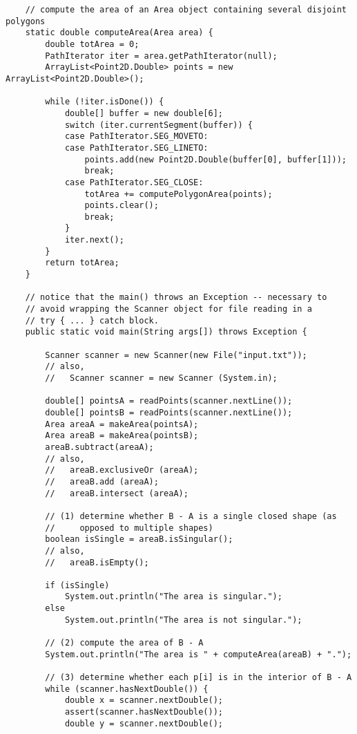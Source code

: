 \begin{lstlisting}
    // compute the area of an Area object containing several disjoint polygons
    static double computeArea(Area area) {
        double totArea = 0;
        PathIterator iter = area.getPathIterator(null);
        ArrayList<Point2D.Double> points = new ArrayList<Point2D.Double>();

        while (!iter.isDone()) {
            double[] buffer = new double[6];
            switch (iter.currentSegment(buffer)) {
            case PathIterator.SEG_MOVETO:
            case PathIterator.SEG_LINETO:
                points.add(new Point2D.Double(buffer[0], buffer[1]));
                break;
            case PathIterator.SEG_CLOSE:
                totArea += computePolygonArea(points);
                points.clear();
                break;
            }
            iter.next();
        }
        return totArea;
    }

    // notice that the main() throws an Exception -- necessary to
    // avoid wrapping the Scanner object for file reading in a 
    // try { ... } catch block.
    public static void main(String args[]) throws Exception {

        Scanner scanner = new Scanner(new File("input.txt"));
        // also,
        //   Scanner scanner = new Scanner (System.in);

        double[] pointsA = readPoints(scanner.nextLine());
        double[] pointsB = readPoints(scanner.nextLine());
        Area areaA = makeArea(pointsA);
        Area areaB = makeArea(pointsB);
        areaB.subtract(areaA);
        // also,
        //   areaB.exclusiveOr (areaA);
        //   areaB.add (areaA);
        //   areaB.intersect (areaA);
        
        // (1) determine whether B - A is a single closed shape (as 
        //     opposed to multiple shapes)
        boolean isSingle = areaB.isSingular();
        // also,
        //   areaB.isEmpty();

        if (isSingle)
            System.out.println("The area is singular.");
        else
            System.out.println("The area is not singular.");
        
        // (2) compute the area of B - A
        System.out.println("The area is " + computeArea(areaB) + ".");
        
        // (3) determine whether each p[i] is in the interior of B - A
        while (scanner.hasNextDouble()) {
            double x = scanner.nextDouble();
            assert(scanner.hasNextDouble());
            double y = scanner.nextDouble();


\end{lstlisting}
